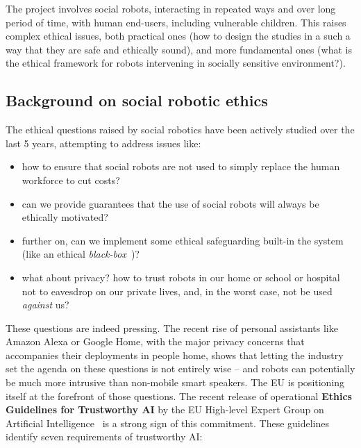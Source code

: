 The \project project involves social robots, interacting in repeated ways and
over long period of time, with human end-users, including vulnerable children.
This raises complex ethical issues, both practical ones (how to design the
\project studies in a such a way that they are safe and ethically sound), and
more fundamental ones (what is the ethical framework for robots intervening in
socially sensitive environment?).



\subsection{Background on social robotic ethics}\label{ethics}

The ethical questions raised by social robotics have been actively studied over
the last 5 years, attempting to address issues like:

\begin{itemize}
    \item how to ensure that social robots are not used to simply replace the human
        workforce to cut costs?
    \item can we provide guarantees that the use of social robots will always be
        ethically motivated?
    \item further on, can we implement some ethical safeguarding built-in
        the system (like an ethical \emph{black-box}~\cite{winfield2017case})?
    \item what about privacy? how to trust robots in our home or school or
        hospital not to eavesdrop on our private lives, and, in the worst
        case, not be used \emph{against} us?
\end{itemize}

These questions are indeed pressing. The recent rise of personal assistants like
Amazon Alexa or Google Home, with the major privacy concerns that accompanies
their deployments in people home, shows that letting the industry set the agenda
on these questions is not entirely wise -- and robots can potentially be much
more intrusive than non-mobile smart speakers.  The EU is positioning itself at
the forefront of those questions. The recent release of operational \textbf{Ethics
Guidelines for Trustworthy AI} by the EU High-level Expert Group on Artificial
Intelligence~\cite{eu2019ethics} is a strong sign of this commitment. These
guidelines identify seven requirements of trustworthy AI:

